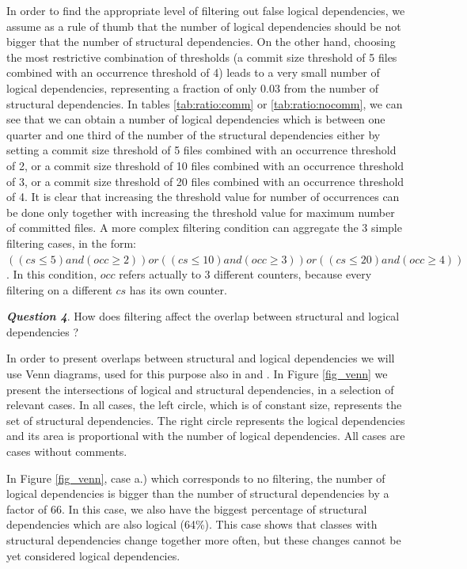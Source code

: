 \documentclass[conference]{IEEEtran}
\begin{document}
In order to find the appropriate level of filtering out false logical dependencies, we assume as a rule of thumb that the number of logical dependencies should be not bigger that the number of structural dependencies. On the other hand, choosing the most restrictive combination of thresholds (a commit size threshold of 5 files combined with an occurrence threshold of 4) leads to a very small number of logical dependencies, representing a fraction of only 0.03 from the number of structural dependencies. 
In tables \ref{tab:ratio:comm} or \ref{tab:ratio:nocomm}, we can see that we can obtain a number of logical dependencies which is between one quarter and one third of the number of the structural dependencies either by setting a commit size threshold of 5 files combined with an occurrence threshold of 2, or a commit size threshold of 10 files combined with an occurrence threshold of 3, or a commit size threshold of 20 files combined with an occurrence threshold of 4.  It is clear that increasing the threshold value for number of occurrences can be done only together with increasing the threshold value for maximum number of committed files. A more complex filtering condition can aggregate the 3 simple filtering cases, in the form: $((cs\leq 5) and (occ\geq 2)) or ((cs\leq 10) and (occ\geq 3)) or ((cs\leq 20) and (occ\geq 4))$. In this condition, $occ$ refers actually to 3 different counters, because every filtering on a different $cs$ has its own counter.  


\textit{\textbf{Question 4}}. How does filtering affect the overlap between structural and logical dependencies ? 

In order to present overlaps between structural and logical dependencies we will use Venn diagrams, used for this purpose also in \cite{Oliva:2011:ISL:2067853.2068086} and \cite{DBLP:journals/jss/AjienkaC17}. In Figure \ref{fig_venn} we present the intersections of logical and structural dependencies, in a selection of relevant cases. In all cases, the left circle, which is of constant size, represents the set of structural dependencies. The right circle represents the logical dependencies and its area is proportional with the number of logical dependencies. All cases are cases without comments.

In Figure \ref{fig_venn}, case a.) which corresponds to no filtering, the number of logical dependencies is bigger than the number of structural dependencies by a factor of 66. In this case, we also have the biggest percentage of structural dependencies which are also logical (64\%). This case shows that classes with structural dependencies change together more often, but these changes cannot be yet considered logical dependencies.
\end{document}
